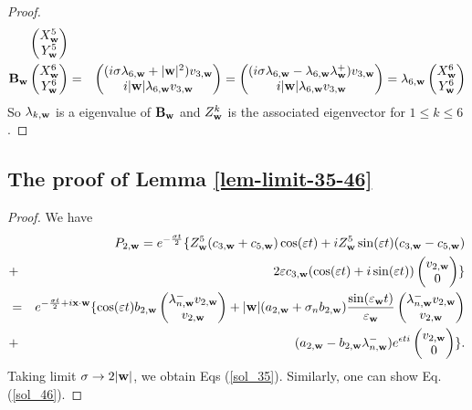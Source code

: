 \documentclass[10pt,reqno]{amsart}
\def\eps{\varepsilon}
\renewcommand{\(}{\left(}
\renewcommand{\)}{\right)}
\newcommand{\bw}{{\bf w}}
\newcommand{\BB}{{\bf B}}
\newcommand{\bx}{\mathbf{x}}
\numberwithin{equation}{section}
\begin{document}
\begin{proof}
\begin{eqnarray*}
\begin{pmatrix}
			X^5_{\bw}  \\
			Y^5_{\bw}
		\end{pmatrix} \\
		\BB_{\bw} \begin{pmatrix}
			X^6_{\bw}  \\
			Y^6_{\bw}
		\end{pmatrix} &=&  \begin{pmatrix}
			(i\sigma \lambda_{6,\bw} + |\bw|^2 )  v_{3,\bw} \\
			i|\bw| \lambda_{6,\bw} v_{3,\bw} 
		\end{pmatrix} = \begin{pmatrix}
			(i\sigma \lambda_{6,\bw} - \lambda_{6,\bw}\lambda^+_{\bw} )  v_{3,\bw} \\
			i|\bw| \lambda_{6,\bw} v_{3,\bw} 
		\end{pmatrix} =  \lambda_{6,\bw}\begin{pmatrix}
			X^6_{\bw}  \\
			Y^6_{\bw}
		\end{pmatrix} \nonumber
	\end{eqnarray*}
So $\lambda_{k,\bw}$ is a eigenvalue of $\BB_{\bw}$ and $Z^k_{\bw}$ is the associated  eigenvector for $1\le k \le 6$.
\end{proof}
\subsection{The proof of Lemma \ref{lem-limit-35-46}}\label{app-lem-limit-35-46}
\begin{proof}
We have
\begin{eqnarray*}
	& & P_{2,\bw} = e^{-\frac {\sigma t}2}\{
	Z^5_{\bw} (c_{3,\bw} + c_{5,\bw})\cos(\eps t) + i Z^5_{\bw} \sin(\eps t) (c_{3,\bw} - c_{5,\bw}) \nonumber\\
	&+& 2\eps c_{3,\bw} (\cos(\eps t) + i\sin(\eps t)) \begin{pmatrix}
		v_{2,\bw}\\
		0
	\end{pmatrix} \}\\
	&=& e^{-\frac {\sigma t}2 +i\bx\cdot \bw}\{
	\cos(\eps t)b_{2,\bw}  \begin{pmatrix}
		\lambda^-_{n,\bw}v_{2,\bw}\\
		v_{2,\bw}
	\end{pmatrix} + |\bw|(a_{2,\bw} + \sigma_n b_{2,\bw})\frac{\sin(\eps_{\bw} t)}{\eps_{\bw}} \begin{pmatrix}
		\lambda^-_{n,\bw}v_{2,\bw}\\
		v_{2,\bw}
	\end{pmatrix} \nonumber\\
	&+& (a_{2,\bw} - b_{2,\bw}\lambda^-_{n,\bw}) e^{\epsilon t i}\begin{pmatrix}
		v_{2,\bw}\\
		0
	\end{pmatrix} \}.
\end{eqnarray*}
Taking limit $\sigma\to 2|\bw|$, we obtain Eqs (\ref{sol_35}). Similarly, one can show Eq. (\ref{sol_46}).  
\end{proof}
\end{document}
